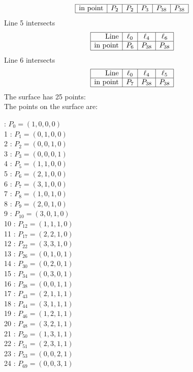 \documentclass{article}
\begin{document}
{$$\begin{array}{|r*{5}{|c}|}
\hline
\mbox{in point}  & P_{2} & P_{2} & P_{3} & P_{38} & P_{38}\\
\hline
\end{array}
$$
Line 5 intersects 
$$
\begin{array}{|r*{3}{|c}|}
\hline
\mbox{Line}  & \ell_{0} & \ell_{4} & \ell_{6}\\
\hline
\mbox{in point}  & P_{6} & P_{38} & P_{38}\\
\hline
\end{array}
$$
Line 6 intersects 
$$
\begin{array}{|r*{3}{|c}|}
\hline
\mbox{Line}  & \ell_{0} & \ell_{4} & \ell_{5}\\
\hline
\mbox{in point}  & P_{7} & P_{38} & P_{38}\\
\hline
\end{array}
$$
The surface has 25 points:\\
The points on the surface are:\\
\begin{multicols}{3}
 : $P_{0}=( 1, 0, 0, 0 )$\\
1 : $P_{1}=( 0, 1, 0, 0 )$\\
2 : $P_{2}=( 0, 0, 1, 0 )$\\
3 : $P_{3}=( 0, 0, 0, 1 )$\\
4 : $P_{5}=( 1, 1, 0, 0 )$\\
5 : $P_{6}=( 2, 1, 0, 0 )$\\
6 : $P_{7}=( 3, 1, 0, 0 )$\\
7 : $P_{8}=( 1, 0, 1, 0 )$\\
8 : $P_{9}=( 2, 0, 1, 0 )$\\
9 : $P_{10}=( 3, 0, 1, 0 )$\\
10 : $P_{12}=( 1, 1, 1, 0 )$\\
11 : $P_{17}=( 2, 2, 1, 0 )$\\
12 : $P_{22}=( 3, 3, 1, 0 )$\\
13 : $P_{26}=( 0, 1, 0, 1 )$\\
14 : $P_{30}=( 0, 2, 0, 1 )$\\
15 : $P_{34}=( 0, 3, 0, 1 )$\\
16 : $P_{38}=( 0, 0, 1, 1 )$\\
17 : $P_{43}=( 2, 1, 1, 1 )$\\
18 : $P_{44}=( 3, 1, 1, 1 )$\\
19 : $P_{46}=( 1, 2, 1, 1 )$\\
20 : $P_{48}=( 3, 2, 1, 1 )$\\
21 : $P_{50}=( 1, 3, 1, 1 )$\\
22 : $P_{51}=( 2, 3, 1, 1 )$\\
23 : $P_{53}=( 0, 0, 2, 1 )$\\
24 : $P_{69}=( 0, 0, 3, 1 )$\\
\end{multicols}


}
\end{document}
